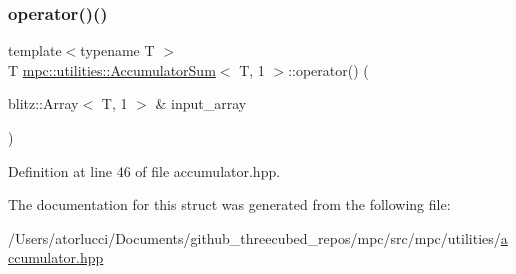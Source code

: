 \subsubsection{\texorpdfstring{operator()()}{operator()()}}
{\footnotesize\ttfamily template$<$typename T $>$ \\
T \mbox{\hyperlink{structmpc_1_1utilities_1_1_accumulator_sum}{mpc\+::utilities\+::\+Accumulator\+Sum}}$<$ T, 1 $>$\+::operator() (\begin{DoxyParamCaption}\item[{blitz\+::\+Array$<$ T, 1 $>$ \&}]{input\+\_\+array }\end{DoxyParamCaption})\hspace{0.3cm}{\ttfamily [inline]}}



Definition at line 46 of file accumulator.\+hpp.



The documentation for this struct was generated from the following file\+:\begin{DoxyCompactItemize}
\item 
/\+Users/atorlucci/\+Documents/github\+\_\+threecubed\+\_\+repos/mpc/src/mpc/utilities/\mbox{\hyperlink{accumulator_8hpp}{accumulator.\+hpp}}\end{DoxyCompactItemize}
